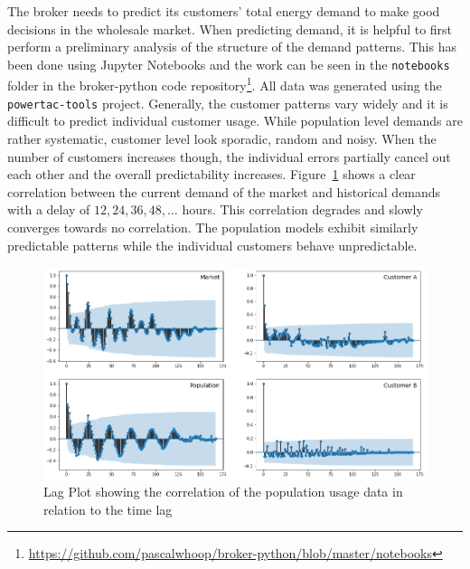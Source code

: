 
The broker needs to predict its customers' total energy demand to make good decisions in the wholesale market.
When predicting demand, it is helpful to first perform a preliminary analysis of the structure of the demand patterns.
This has been done using Jupyter Notebooks and the work can be seen in the \texttt{notebooks} folder in the
broker-python code repository\footnote{\url{https://github.com/pascalwhoop/broker-python/blob/master/notebooks}}. All data was generated using the
\texttt{powertac-tools} project. Generally, the customer patterns vary widely and it is difficult to predict individual
customer usage. While population level demands are rather systematic, customer level look sporadic, random and noisy.
When the number of customers increases though, the individual errors partially cancel out each other and the overall
predictability increases.  Figure~\ref{fig:demandtimelag} shows a clear correlation between the current demand of the
market and historical demands with a delay of $12,24,36,48,\ldots$ hours. This correlation degrades and slowly
converges towards no correlation. The population models exhibit similarly predictable patterns while the individual
customers behave unpredictable.

\begin{figure}[h]
    \centering
    \includegraphics[width=1.0\linewidth]{img/demand_7.png}
    \caption{Lag Plot showing the correlation of the population usage data in relation to the time lag}
    \label{fig:demandtimelag}
\end{figure}

